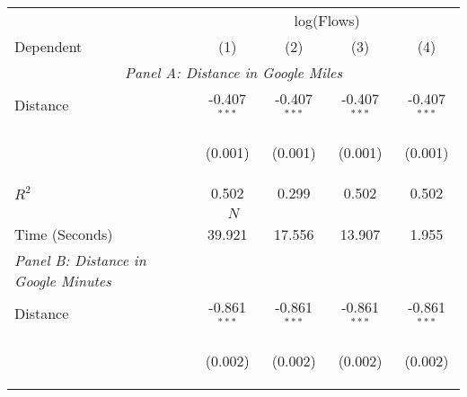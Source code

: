 \begin{center}
\begin{tabular}{lcccc}
\hline \noalign{\smallskip} & \multicolumn{4}{c}{log(Flows)}\\
Dependent & (1) & (2) & (3) & (4)\\
\hline \multicolumn{5}{c}{\textit{Panel A: Distance in Google Miles}}\\
\noalign{\smallskip}\noalign{\smallskip}Distance & -0.407$ ^{***}$ & -0.407$ ^{***}$ & -0.407$ ^{***}$ & -0.407$ ^{***}$\\
 & \begin{footnotesize}(0.001)\end{footnotesize} & \begin{footnotesize}(0.001)\end{footnotesize} & \begin{footnotesize}(0.001)\end{footnotesize} & \begin{footnotesize}(0.001)\end{footnotesize}\\
\noalign{\smallskip}$ R^2$ & 0.502 & 0.299 & 0.502 & 0.502\\
\multicolumn{5}{c}{$ N$}\\
\noalign{\smallskip}Time (Seconds) & 39.921 & 17.556 & 13.907 & 1.955\\
\textit{Panel B: Distance in Google Minutes} & \begin{footnotesize}\end{footnotesize} & \begin{footnotesize}\end{footnotesize} & \begin{footnotesize}\end{footnotesize} & \begin{footnotesize}\end{footnotesize}\\
\noalign{\smallskip}Distance & -0.861$ ^{***}$ & -0.861$ ^{***}$ & -0.861$ ^{***}$ & -0.861$ ^{***}$\\
 & \begin{footnotesize}(0.002)\end{footnotesize} & \begin{footnotesize}(0.002)\end{footnotesize} & \begin{footnotesize}(0.002)\end{footnotesize} & \begin{footnotesize}(0.002)\end{footnotesize}\\

\end{tabular}
\end{center}
